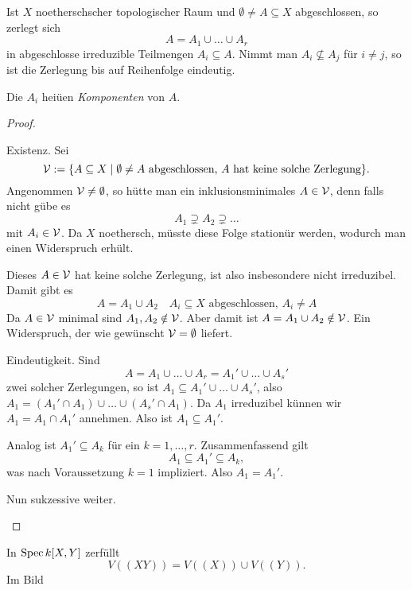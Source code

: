 \begin{satz}
	Ist $X$ noetherschscher topologischer Raum und 
	$\emptyset \neq A \subseteq X$ abgeschlossen, so zerlegt sich
	\[
		A = A_1 \cup \ldots \cup A_r
	\]
	in abgeschlosse irreduzible Teilmengen $A_i \subseteq A$.
	Nimmt man $A_i \not\subseteq A_j$ für $i\neq j$, so ist die Zerlegung
	bis auf Reihenfolge eindeutig.
	
	Die $A_i$ heiüen \emph{Komponenten} von $A$.
\end{satz}
\begin{proof}
	\begin{description sf}
	\item[Existenz.]
		Sei 
		\[
			\cal V := \{ A\subseteq X \mid \emptyset \neq A 
				\text{ abgeschlossen, $A$ hat keine solche Zerlegung} \}. 
		\]
		Angenommen $\cal V \neq\emptyset$, so hütte man
		ein inklusionsminimales $A \in \cal V$, denn falls nicht gübe es
		\[
			A_1 \supsetneq A_2 \supsetneq \ldots
		\]
		mit $A_i \in \cal V$. Da $X$ noethersch, müsste diese Folge
		stationür werden, wodurch man einen Widerspruch erhült.
		
		Dieses $A \in \cal V$ hat keine solche Zerlegung, ist also
		insbesondere nicht irreduzibel. Damit gibt es
		\[
			A = A_1 \cup A_2\quad A_i \subseteq X \text{ abgeschlossen, }
			A_i \neq A
		\]
		Da $A \in \cal V$ minimal sind $A_1, A_2 \notin \cal V$.
		Aber damit ist
		$A = A_1 \cup A_2 \notin \cal V$. Ein Widerspruch, der wie gewünscht
		$\cal V = \emptyset$ liefert.
	\item[Eindeutigkeit.]
		Sind 
		\[
			A = A_1 \cup \ldots \cup A_r = 
				A_1' \cup \ldots \cup A_s'
		\]
		zwei solcher Zerlegungen, so ist
		$A_1 \subseteq A_1' \cup \ldots \cup A_s'$, also
		$A_1 = (A_1' \cap A_1) \cup \ldots \cup (A_s' \cap A_1)$.
		Da $A_1$ irreduzibel künnen wir \obda $A_1 = A_1 \cap A_1'$ 
		annehmen. Also ist $A_1 \subseteq A_1'$.
		
		Analog ist $A_1' \subseteq A_k$ für ein $k=1,\ldots,r$.
		Zusammenfassend gilt
		\[
			A_1 \subseteq A_1' \subseteq A_k,
		\]
		was nach Voraussetzung $k = 1$ impliziert. Also $A_1 = A_1'$.
		
		Nun sukzessive weiter. 
	\end{description sf}
\end{proof}

\begin{beispiel}
	In $\Spec k[X,Y]$ zerfüllt
	\[
		V((XY)) = V((X)) \cup V((Y)).
	\]
	Im Bild
\end{beispiel}

